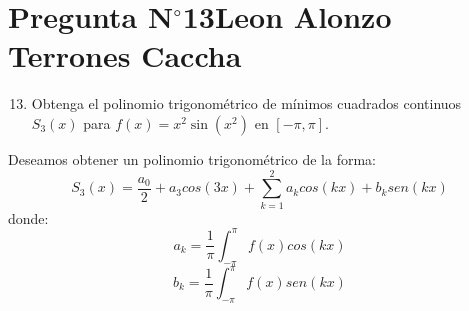 \section{Pregunta N$^{\circ}$13\qquad Leon Alonzo Terrones Caccha}

\begin{frame}
    \begin{enumerate}\setcounter{enumi}{12}
        \item

              Obtenga el polinomio trigonométrico de mínimos
              cuadrados continuos $S_{3}\left(x\right)$ para
              \begin{math}
                  f\left(x\right)=
                  x^{2}\sin
                  \left(x^{2}\right)
              \end{math}
              en
              \begin{math}
                  \left[-\pi,\pi\right]
              \end{math}.
    \end{enumerate}

    \begin{solution}
        Deseamos obtener un polinomio trigonométrico de la forma:
        \[S_{3}\left(x\right)=\frac{a_{0}}{2}+a_{3}cos(3x)+\sum_{k=1}^{2}{a_kcos(kx)+b_ksen(kx)}\]
        donde:
        \[a_k=\frac{1}{\pi}\int_{-\pi}^{\pi}{f(x)cos(kx)}\]
        \[b_k=\frac{1}{\pi}\int_{-\pi}^{\pi}{f(x)sen(kx)}\]
    \end{solution}
\end{frame}


